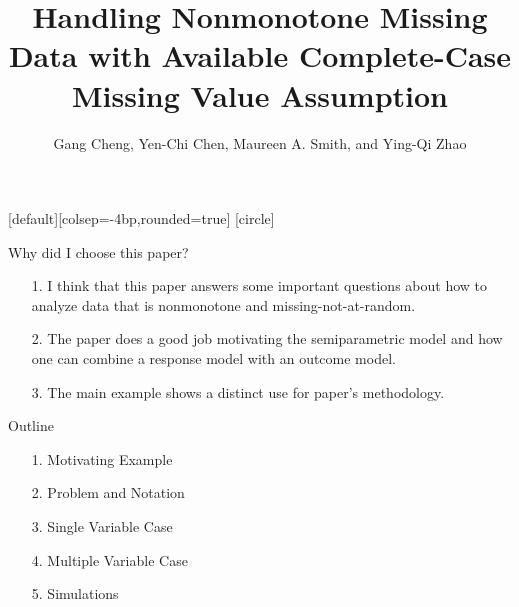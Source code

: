 \documentclass{beamer} %
\author[Cheng et al.]{Gang Cheng, Yen-Chi Chen, Maureen A. Smith, and Ying-Qi Zhao}
\title[Nonmonotone MNAR Data]{Handling Nonmonotone Missing Data with Available
Complete-Case Missing Value Assumption}
\begin{document}
\everymath{\displaystyle}
[default][colsep=-4bp,rounded=true]
[circle]
\frame{\titlepage}


\begin{frame}{Why did I choose this paper?}

  \nocite{cheng2022handling}
  \begin{itemize}
    \item[1.] I think that this paper answers some important questions about how
      to analyze data that is nonmonotone and missing-not-at-random.
    \item[2.] The paper does a good job motivating the semiparametric model and
      how one can combine a response model with an outcome model.
    \item[3.] The main example shows a distinct use for paper's methodology.
  \end{itemize}

\end{frame}

\begin{frame}{Outline}
  \begin{itemize}
    \item[1.] Motivating Example
    \item[2.] Problem and Notation
    \item[3.] Single Variable Case
    \item[4.] Multiple Variable Case
    \item[5.] Simulations
  \end{itemize}
\end{frame}
\end{document}
